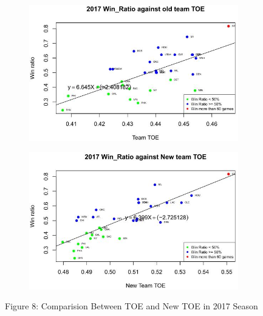 \documentclass[11pt]{article}
\begin{document}
\begin{figure}[h!]
  \centering
  \begin{subfigure}[b]{0.45\linewidth}
    \includegraphics[width=\linewidth]{17old.jpg}
  \end{subfigure}
  \begin{subfigure}[b]{0.45\linewidth}
    \includegraphics[width=\linewidth]{17new.jpg}
  \end{subfigure}
\bigskip

Figure 8: Comparision Between TOE and New TOE in 2017 Season
\end{figure}
\end{document}
